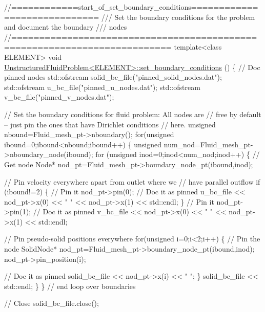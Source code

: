 \begin{DoxyCodeInclude}

 

\textcolor{comment}{//============start\_of\_set\_boundary\_conditions=============================}\textcolor{comment}{}
\textcolor{comment}{/// Set the boundary conditions for the problem and document the boundary}
\textcolor{comment}{/// nodes}
\textcolor{comment}{}\textcolor{comment}{//==========================================================================}
\textcolor{keyword}{template}<\textcolor{keyword}{class} ELEMENT>
\textcolor{keywordtype}{void} \hyperlink{classUnstructuredFluidProblem_a4e57ba31d35b62c9c657c1cfd822ecde}{UnstructuredFluidProblem<ELEMENT>::set\_boundary\_conditions}
      ()
\{ 
 \textcolor{comment}{// Doc pinned nodes}
 std::ofstream solid\_bc\_file(\textcolor{stringliteral}{"pinned\_solid\_nodes.dat"});
 std::ofstream u\_bc\_file(\textcolor{stringliteral}{"pinned\_u\_nodes.dat"});
 std::ofstream v\_bc\_file(\textcolor{stringliteral}{"pinned\_v\_nodes.dat"});

 \textcolor{comment}{// Set the boundary conditions for fluid problem: All nodes are}
 \textcolor{comment}{// free by default -- just pin the ones that have Dirichlet conditions}
 \textcolor{comment}{// here. }
 \textcolor{keywordtype}{unsigned} nbound=Fluid\_mesh\_pt->nboundary();
 \textcolor{keywordflow}{for}(\textcolor{keywordtype}{unsigned} ibound=0;ibound<nbound;ibound++)
  \{
   \textcolor{keywordtype}{unsigned} num\_nod=Fluid\_mesh\_pt->nboundary\_node(ibound);
   \textcolor{keywordflow}{for} (\textcolor{keywordtype}{unsigned} inod=0;inod<num\_nod;inod++)
    \{
     \textcolor{comment}{// Get node}
     Node* nod\_pt=Fluid\_mesh\_pt->boundary\_node\_pt(ibound,inod);

     \textcolor{comment}{// Pin velocity everywhere apart from outlet where we}
     \textcolor{comment}{// have parallel outflow}
     \textcolor{keywordflow}{if} (ibound!=2)
      \{
       \textcolor{comment}{// Pin it}
       nod\_pt->pin(0);
       \textcolor{comment}{// Doc it as pinned}
       u\_bc\_file << nod\_pt->x(0) << \textcolor{stringliteral}{" "} << nod\_pt->x(1) << std::endl;
      \}
     \textcolor{comment}{// Pin it}
     nod\_pt->pin(1);
     \textcolor{comment}{// Doc it as pinned}
     v\_bc\_file << nod\_pt->x(0) << \textcolor{stringliteral}{" "} << nod\_pt->x(1) << std::endl;
     
     \textcolor{comment}{// Pin pseudo-solid positions everywhere}
     \textcolor{keywordflow}{for}(\textcolor{keywordtype}{unsigned} i=0;i<2;i++)
      \{
       \textcolor{comment}{// Pin the node}
       SolidNode* nod\_pt=Fluid\_mesh\_pt->boundary\_node\_pt(ibound,inod);
       nod\_pt->pin\_position(i);
       
       \textcolor{comment}{// Doc it as pinned}
       solid\_bc\_file << nod\_pt->x(i) << \textcolor{stringliteral}{" "};
      \}
     solid\_bc\_file << std::endl;    
    \}
  \} \textcolor{comment}{// end loop over boundaries}

 \textcolor{comment}{// Close}
 solid\_bc\_file.close();

\end{DoxyCodeInclude}


